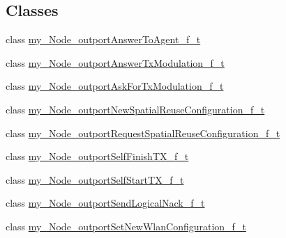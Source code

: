 \subsection*{Classes}
\begin{DoxyCompactItemize}
\item 
class \hyperlink{classcompcxx__Node__23_1_1my__Node__outportAnswerToAgent__f__t}{my\+\_\+\+Node\+\_\+outport\+Answer\+To\+Agent\+\_\+f\+\_\+t}
\item 
class \hyperlink{classcompcxx__Node__23_1_1my__Node__outportAnswerTxModulation__f__t}{my\+\_\+\+Node\+\_\+outport\+Answer\+Tx\+Modulation\+\_\+f\+\_\+t}
\item 
class \hyperlink{classcompcxx__Node__23_1_1my__Node__outportAskForTxModulation__f__t}{my\+\_\+\+Node\+\_\+outport\+Ask\+For\+Tx\+Modulation\+\_\+f\+\_\+t}
\item 
class \hyperlink{classcompcxx__Node__23_1_1my__Node__outportNewSpatialReuseConfiguration__f__t}{my\+\_\+\+Node\+\_\+outport\+New\+Spatial\+Reuse\+Configuration\+\_\+f\+\_\+t}
\item 
class \hyperlink{classcompcxx__Node__23_1_1my__Node__outportRequestSpatialReuseConfiguration__f__t}{my\+\_\+\+Node\+\_\+outport\+Request\+Spatial\+Reuse\+Configuration\+\_\+f\+\_\+t}
\item 
class \hyperlink{classcompcxx__Node__23_1_1my__Node__outportSelfFinishTX__f__t}{my\+\_\+\+Node\+\_\+outport\+Self\+Finish\+T\+X\+\_\+f\+\_\+t}
\item 
class \hyperlink{classcompcxx__Node__23_1_1my__Node__outportSelfStartTX__f__t}{my\+\_\+\+Node\+\_\+outport\+Self\+Start\+T\+X\+\_\+f\+\_\+t}
\item 
class \hyperlink{classcompcxx__Node__23_1_1my__Node__outportSendLogicalNack__f__t}{my\+\_\+\+Node\+\_\+outport\+Send\+Logical\+Nack\+\_\+f\+\_\+t}
\item 
class \hyperlink{classcompcxx__Node__23_1_1my__Node__outportSetNewWlanConfiguration__f__t}{my\+\_\+\+Node\+\_\+outport\+Set\+New\+Wlan\+Configuration\+\_\+f\+\_\+t}
\end{DoxyCompactItemize}
